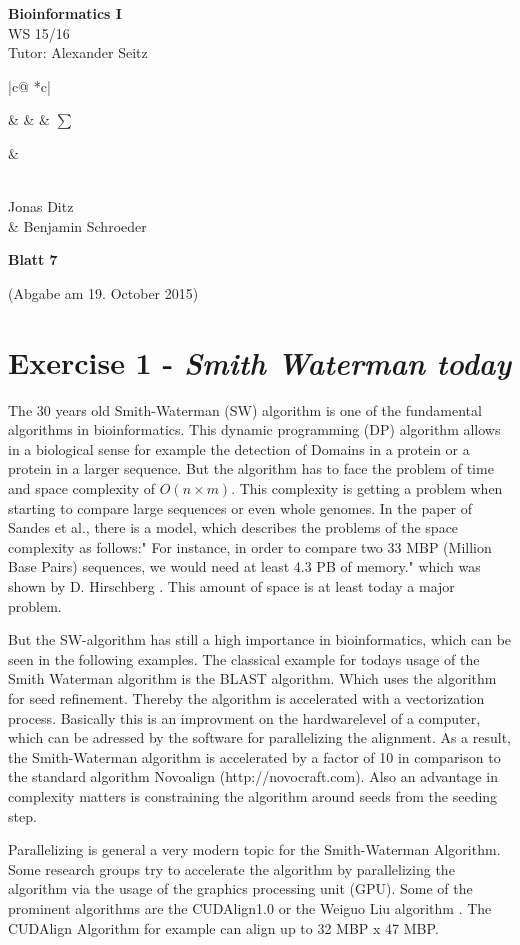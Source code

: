 \documentclass[%
   10pt,              %
   ngerman,           %
   a4paper,           %
   DIV11,             %
]{scrartcl}%
\makeatletter
\def\header#1#2#3#4#5#6#7{\pagestyle{empty}
\noindent
\begin{minipage}[t]{0.6\textwidth}
\begin{flushleft}
\textbf{#4}\\%
#6\\%
Tutor: #2  %
\end{flushleft}
\end{minipage}
\begin{minipage}[t]{0.4\textwidth}
\begin{flushright}
\points{#7}%
\vspace*{0.2cm}
#5%
\end{flushright}
\end{minipage}

\begin{center}
{\Large\textbf{ Blatt #1}} %

{(Abgabe am #3)} %
\end{center}
}
\newenvironment{vartab}[1]
{
    \begin{tabular}{ |c@{} *{#1}{c|} } %
}{
    \end{tabular}
}
\newcommand{\myformat}[1]{& #1}
\newcommand{\numbers}[1]{
  \newcounter{ctra}
\setcounter{ctra}{1}
\whiledo {\value{ctra} < #1}%
{%
  \myformat{\thectra}
  \stepcounter{ctra}%
}
\myformat{\thectra}
}
\newcommand{\emptyLine}[1]{
  \newcounter{ctra1}
\setcounter{ctra}{1}
\whiledo {\value{ctra1} < #1}%
{%
  \myformat{\hspace*{0.5cm}}
  \stepcounter{ctra1}%
}
}
\newcommand{\points}[1]{
\newcounter{colmns}
\setcounter{colmns}{#1}
\stepcounter{colmns}
  \begin{vartab}{\thecolmns}
    \numbers{#1} & $\sum$\\\hline
    \emptyLine{\thecolmns}\\
  \end{vartab}
}
\makeatother
\begin{document}
\header{7}{Alexander Seitz}{19. October 2015}{Bioinformatics I}{\\Jonas Ditz \\\& Benjamin Schroeder}{WS 15/16}{3}

  \section*{Exercise 1 - \textsl{Smith Waterman today}}
	  The 30 years old Smith-Waterman (SW) algorithm is one of the fundamental algorithms in bioinformatics. This dynamic programming (DP) algorithm allows in a biological sense for example the detection of Domains in a protein or a protein in a larger sequence. But the algorithm has to face the problem of time and space complexity of $O(n\times m)$. This complexity is getting a problem when starting to compare large sequences or even whole genomes. In the paper of Sandes et al., there is a model, which describes the problems of the space complexity as follows:"  For instance, in order to compare two 33 MBP (Million Base Pairs) sequences, we would need at least
	  4.3 PB of memory." \cite{GPU} which was shown by D. Hirschberg \cite{algoritm}. This amount of space is at least today a major problem.
	  
	  But the SW-algorithm has still a high importance in bioinformatics, which can be seen in the following examples.
	  The classical example for todays usage of the Smith Waterman algorithm is the BLAST algorithm. Which uses the algorithm for seed refinement. Thereby the algorithm is accelerated with a vectorization process. Basically this is an improvment on the hardwarelevel of a computer, which can be adressed by the software for parallelizing the alignment. As a result, the Smith-Waterman algorithm is accelerated by a factor of 10 in comparison to the standard algorithm Novoalign (http://novocraft.com). Also an advantage in complexity matters is constraining the algorithm around seeds from the seeding step.
	   \cite{blast}
	   
	  Parallelizing is general a very modern topic for the Smith-Waterman Algorithm. Some research groups try to accelerate the algorithm by parallelizing the algorithm via the usage of the graphics processing unit (GPU). Some of the prominent algorithms are the CUDAlign1.0 \cite{CUD} or the Weiguo Liu algorithm \cite{Liu}. The CUDAlign Algorithm for example can align up to 32 MBP x 47 MBP.
	  \cite{GPU}
	  
\end{document}
